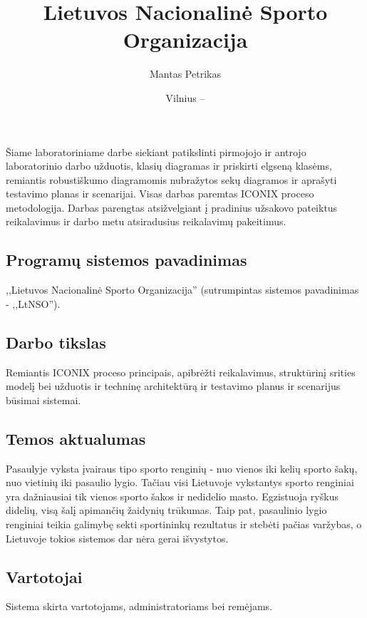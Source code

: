\documentclass{VUMIFPSkursinis}
\title{Lietuvos Nacionalinė Sporto Organizacija}
\author{Mantas Petrikas}
\date{Vilnius – \the\year}
\begin{document}
    \maketitle
    \tableofcontents
    
     \label{anotacija}
		Šiame laboratoriniame darbe siekiant patikslinti pirmojojo ir antrojo laboratorinio darbo užduotis, klasių diagramas ir priskirti elgseną klasėms, remiantis robustiškumo diagramomis nubražytos sekų diagramos ir aprašyti testavimo planas ir scenarijai. Visas darbas paremtas ICONIX proceso metodologija.
		Darbas parengtas atsižvelgiant į pradinius užsakovo pateiktus reikalavimus ir darbo metu atsiradusius reikalavimų pakeitimus.
		
     \label{ivadas}	
        \subsection*{Programų sistemos pavadinimas} \label{ivadas_psPavadinimas}
            ,,Lietuvos Nacionalinė Sporto Organizacija'' (sutrumpintas sistemos pavadinimas - ,,LtNSO'').
        \subsection*{Darbo tikslas} \label{ivadas_darboTikslas}
            Remiantis ICONIX proceso principais, apibrėžti reikalavimus, struktūrinį srities modelį bei užduotis ir techninę architektūrą ir testavimo planus ir scenarijus būsimai sistemai.
        \subsection*{Temos aktualumas} \label{ivadas_aktualumas}
            Pasaulyje vyksta įvairaus tipo sporto renginių - nuo vienos iki kelių sporto šakų, nuo vietinių iki pasaulio lygio. Tačiau visi Lietuvoje vykstantys sporto renginiai yra dažniausiai tik vienos sporto šakos ir nedidelio masto. Egzistuoja ryškus didelių, visą šalį apimančių žaidynių trūkumas. Taip pat, pasaulinio lygio renginiai teikia galimybę sekti sportininkų rezultatus ir stebėti pačias varžybas, o Lietuvoje tokios sistemos dar nėra gerai išvystytos.
        \subsection*{Vartotojai} \label{ivadas_naudotojai}
            Sistema skirta vartotojams, administratoriams bei remėjams.
\end{document}
